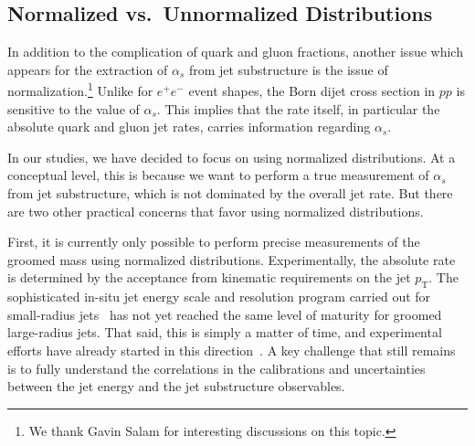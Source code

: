 \subsection{Normalized vs.\ Unnormalized Distributions}
\label{subsec:norm}

In addition to the complication of quark and gluon fractions, another issue which appears for the extraction of $\alpha_s$ from jet substructure is the issue of normalization.\footnote{We thank Gavin Salam for interesting discussions on this topic.  }
%
Unlike for $e^+e^-$ event shapes, the Born dijet cross section in $pp$ is sensitive to the value of $\alpha_s$.
%
This implies that the rate itself, in particular the absolute quark and gluon jet rates, carries information regarding $\alpha_s$. 

In our studies, we have decided to focus on using normalized distributions.
%
At a conceptual level, this is because we want to perform a true measurement of $\alpha_s$ from jet substructure, which is not dominated by the overall jet rate.
%
But there are two other practical concerns that favor using normalized distributions.

First, it is currently only possible to perform precise measurements of the groomed mass using normalized distributions.
%
Experimentally, the absolute rate is determined by the acceptance from kinematic requirements on the jet $p_\text{T}$.
%
The sophisticated in-situ jet energy scale and resolution program carried out for small-radius jets~\cite{Aad:2014bia,Aaboud:2017jcu,Khachatryan:2016kdb,CMS-DP-2016-020} has not yet reached the same level of maturity for groomed large-radius jets.
%
That said, this is simply a matter of time, and experimental efforts have already started in this direction~\cite{ATLAS-CONF-2017-063}.
%
A key challenge that still remains is to fully understand the correlations in the calibrations and uncertainties between the jet energy and the jet substructure observables.

